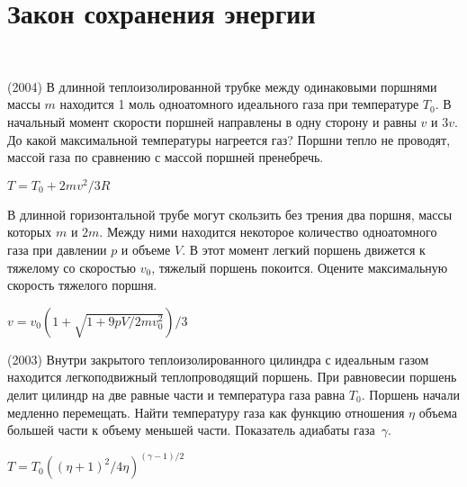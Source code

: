 \section{Закон сохранения энергии}

\begin{ex}
\hspace{0pt} \\
\begin{minipage}{.65\textwidth}
(2004) В длинной теплоизолированной трубке между одинаковыми поршнями массы $m$ находится 1 моль одноатомного идеального газа при температуре $T_0$. 
В начальный момент скорости поршней направлены в одну сторону и равны $v$ и $3v$. До какой максимальной температуры нагреется газ? 
Поршни тепло не проводят, массой газа по сравнению с массой поршней пренебречь.
\end{minipage}
\begin{minipage}{.35\textwidth}
\centering

\end{minipage}
\begin{ans}
$T=T_0+2mv^2/3R$
\end{ans}
\end{ex}

\begin{ex}
В длинной горизонтальной трубе могут скользить без трения два поршня, массы которых $m$ и $2m$. 
Между ними находится некоторое количество одноатомного газа при давлении $p$ и объеме $V$. 
В этот момент легкий поршень движется к тяжелому со скоростью $v_0$, тяжелый поршень покоится. 
Оцените максимальную скорость тяжелого поршня.
\begin{ans}
$v = v_0\left( 1 + \sqrt{1+9pV/2mv_0^2} \right)/3$
\end{ans}
\end{ex}

\begin{ex}
(2003) Внутри закрытого теплоизолированного цилиндра с идеальным газом находится легкоподвижный теплопроводящий поршень. 
При равновесии поршень делит цилиндр на две равные части и температура газа равна $T_0$. Поршень начали медленно перемещать. 
Найти температуру газа как функцию отношения $\eta$ объема большей части к объему меньшей части. Показатель адиабаты газа~$\gamma$.
\begin{ans}
$T=T_0 \left( (\eta + 1)^2/4 \eta \right)^{(\gamma-1)/2}$
\end{ans}
\end{ex}

